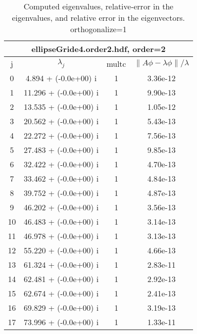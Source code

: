 \begin{table}[H]\tableFont %
\begin{center}
\begin{tabular}{|c|c|c|c|}  \hline
\multicolumn{4}{|c|}{ellipseGride4.order2.hdf, order=2} \\ \hline
   j    &         $\lambda_j$      & multc & $\| A\phi - \lambda\phi\|/\lambda$     \\ \hline
     0  &      4.894 + (-0.0e+00) i   &   1     &    3.36e-12   \\
     1  &     11.296 + (-0.0e+00) i   &   1     &    9.90e-13   \\
     2  &     13.535 + (-0.0e+00) i   &   1     &    1.05e-12   \\
     3  &     20.562 + (-0.0e+00) i   &   1     &    5.43e-13   \\
     4  &     22.272 + (-0.0e+00) i   &   1     &    7.56e-13   \\
     5  &     27.483 + (-0.0e+00) i   &   1     &    9.85e-13   \\
     6  &     32.422 + (-0.0e+00) i   &   1     &    4.70e-13   \\
     7  &     33.462 + (-0.0e+00) i   &   1     &    4.84e-13   \\
     8  &     39.752 + (-0.0e+00) i   &   1     &    4.87e-13   \\
     9  &     46.202 + (-0.0e+00) i   &   1     &    3.56e-13   \\
    10  &     46.483 + (-0.0e+00) i   &   1     &    3.14e-13   \\
    11  &     46.978 + (-0.0e+00) i   &   1     &    3.13e-13   \\
    12  &     55.220 + (-0.0e+00) i   &   1     &    4.66e-13   \\
    13  &     61.324 + (-0.0e+00) i   &   1     &    2.83e-11   \\
    14  &     62.481 + (-0.0e+00) i   &   1     &    2.92e-13   \\
    15  &     62.674 + (-0.0e+00) i   &   1     &    2.41e-13   \\
    16  &     69.829 + (-0.0e+00) i   &   1     &    3.19e-13   \\
    17  &     73.996 + (-0.0e+00) i   &   1     &    1.33e-11   \\
\hline
\end{tabular}
\caption{Computed eigenvalues, relative-error in the eigenvalues, and relative error in the eigenvectors. orthogonalize=1}\label{table:genEigsellipseGride4.order2.hdf}
\end{center}
\end{table}
